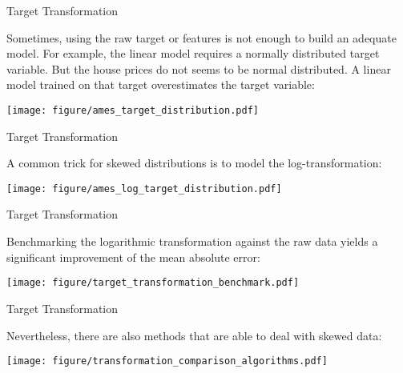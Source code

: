 
\begin{vbframe}{Target Transformation}

Sometimes, using the raw target or features is not enough to build an adequate model.
For example, the linear model requires a normally distributed target variable.
But the house prices do not seems to be normal distributed.
A linear model trained on that target overestimates the target variable:

\vfill

\begin{center}
\texttt{[image: figure/ames\_target\_distribution.pdf]}
\end{center}

\vfill

\end{vbframe}


\begin{vbframe}{Target Transformation}

A common trick for skewed distributions is to model the log-transformation:

\vfill

\begin{center}
\texttt{[image: figure/ames\_log\_target\_distribution.pdf]}
\end{center}

\vfill

\end{vbframe}


\begin{vbframe}{Target Transformation}

Benchmarking the logarithmic transformation against the raw data yields a significant improvement of the mean absolute error:

\vfill

\begin{center}
\texttt{[image: figure/target\_transformation\_benchmark.pdf]}
\end{center}

\vfill

\end{vbframe}


\begin{vbframe}{Target Transformation}

Nevertheless, there are also methods that are able to deal with skewed data:

\vfill

\begin{center}
\texttt{[image: figure/transformation\_comparison\_algorithms.pdf]}
\end{center}

\vfill

\end{vbframe}
